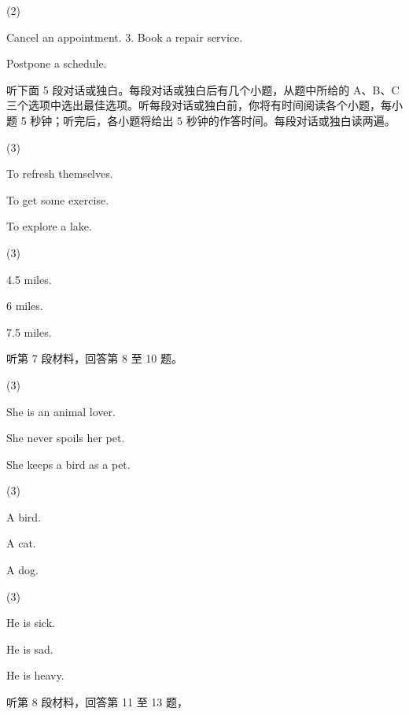 \documentclass{英语试卷}
\begin{document}
\begin{choices}(2)
  \item Cancel an appointment. 3. Book a repair service.
  \item Postpone a schedule.
\end{choices}
\par 听下面 5 段对话或独白。每段对话或独白后有几个小题，从题中所给的 A、B、C 三个选项中选出最佳选项。听每段对话或独白前，你将有时间阅读各个小题，每小题 5 秒钟；听完后，各小题将给出 5 秒钟的作答时间。每段对话或独白读两遍。\par
{}
\begin{choices}(3)
  \item To refresh themselves.
  \item To get some exercise.
  \item To explore a lake.
\end{choices}
\begin{choices}(3)
  \item 4.5 miles.
  \item 6 miles.
  \item 7.5 miles.
\end{choices}
\par 听第 7 段材料，回答第 8 至 10 题。\par
{}
\begin{choices}(3)
  \item She is an animal lover.
  \item She never spoils her pet.
  \item She keeps a bird as a pet.
\end{choices}
\begin{choices}(3)
  \item A bird.
  \item A cat.
  \item A dog.
\end{choices}
\begin{choices}(3)
  \item He is sick.
  \item He is sad.
  \item He is heavy.
\end{choices}
\par 听第 8 段材料，回答第 11 至 13 题，\par
\end{document}
